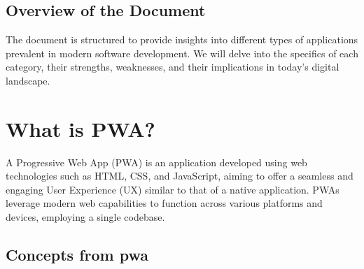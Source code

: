 \documentclass[12pt,a4paper, twosite]{article}
\begin{document}
\subsection{Overview of the Document}
\label{sec:orgdaca22c}

The document is structured to provide 
insights into different types of applications 
prevalent in modern software development. 
We will delve into the specifics of each category, 
their strengths, weaknesses, and their implications 
in today's digital landscape.

\newpage

\section{What is PWA?}
\label{sec:orgc1c4017}

A Progressive Web App (PWA) is an application developed 
using web technologies such as HTML, CSS, and JavaScript, 
aiming to offer a seamless and engaging User Experience (UX) 
similar to that of a native application. PWAs leverage modern 
web capabilities to function across various platforms and devices, 
employing a single codebase.

\subsection{Concepts from pwa}
\label{sec:org24980a8}
\end{document}
